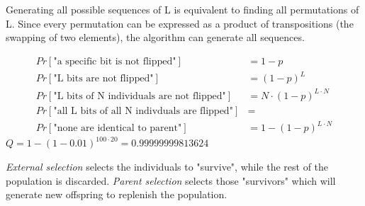 \documentclass[10pt,a4paper,boxed]{hmcpset}
\begin{document}
\begin{problem}[Assignment 46]
\end{problem}
\begin{solution}
Generating all possible sequences of L is equivalent to finding all permutations of L. Since every permutation can be expressed as a product of transpositions (the swapping of two elements), the algorithm can generate all sequences.
\end{solution}

\begin{problem}[Assignment 47]
\end{problem}
\begin{solution}
\begin{align*}
	Pr[\mbox{"a specific bit is not flipped"}] & = 1-p \\
	Pr[\mbox{"L bits are not flipped"}] & = (1-p)^L \\
	Pr[\mbox{"L bits of N individuals are not flipped"}] & = N \cdot (1-p)^{L \cdot N} \\
	Pr[\mbox{"all L bits of all N indivduals are flipped"}] & = \\
	Pr[\mbox{"none are identical to parent"}] & = 1 - (1-p)^{L \cdot N} 
\end{align*}
$Q = 1-(1-0.01)^{100 \cdot 20} = 0.99999999813624$
\end{solution}

\begin{problem}[Assignment 48]
\end{problem}
\begin{solution}
\emph{External selection} selects the individuals to "survive", while the rest of the population is discarded. \emph{Parent selection} selects those "survivors" which will generate new offspring to replenish the population.
\end{solution}

\begin{problem}[Assignment 49]
\end{problem}
\begin{solution}
\end{solution}
\end{document}
